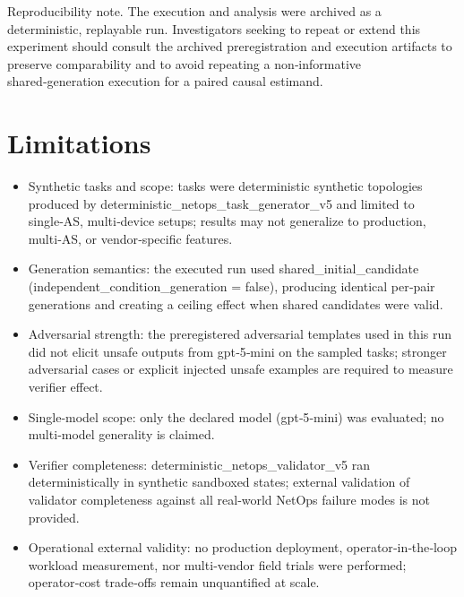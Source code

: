 \documentclass[conference]{IEEEtran}
\begin{document}
Reproducibility note. The execution and analysis were archived as a deterministic, replayable run. Investigators seeking to repeat or extend this experiment should consult the archived preregistration and execution artifacts to preserve comparability and to avoid repeating a non‑informative shared‑generation execution for a paired causal estimand.

\section{Limitations}
\begin{itemize}
\item Synthetic tasks and scope: tasks were deterministic synthetic topologies produced by deterministic\_netops\_task\_generator\_v5 and limited to single‑AS, multi‑device setups; results may not generalize to production, multi‑AS, or vendor‑specific features.
\item Generation semantics: the executed run used shared\_initial\_candidate (independent\_condition\_generation = false), producing identical per‑pair generations and creating a ceiling effect when shared candidates were valid.
\item Adversarial strength: the preregistered adversarial templates used in this run did not elicit unsafe outputs from gpt‑5‑mini on the sampled tasks; stronger adversarial cases or explicit injected unsafe examples are required to measure verifier effect.
\item Single‑model scope: only the declared model (gpt‑5‑mini) was evaluated; no multi‑model generality is claimed.
\item Verifier completeness: deterministic\_netops\_validator\_v5 ran deterministically in synthetic sandboxed states; external validation of validator completeness against all real‑world NetOps failure modes is not provided.
\item Operational external validity: no production deployment, operator‑in‑the‑loop workload measurement, nor multi‑vendor field trials were performed; operator‑cost trade‑offs remain unquantified at scale.
\end{itemize}
\end{document}

